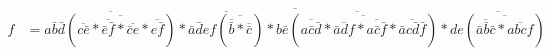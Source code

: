 \begin{align}
	f &= 
	\overline{\overline{a\bar{b}\bar{d}(\overline{\overline{c\bar{e}}*\overline{\bar{e}\bar{f}}*\overline{\bar{c}e}*\overline{e\bar{f}}})}
	*\overline{\bar{a}\bar{d}ef(\overline{\overline{\bar{b}}*\overline{\bar{c}}})}
	*\overline{b\bar{e}(\overline{\overline{a\bar{c}\bar{d}}*\overline{\bar{a}df}*\overline{a\bar{c}\bar{f}}*\overline{\bar{a}c\bar{d}\bar{f}}})}
	*\overline{de(\overline{\overline{\bar{a}\bar{b}\bar{c}}*\overline{abcf}})}}
\end{align}